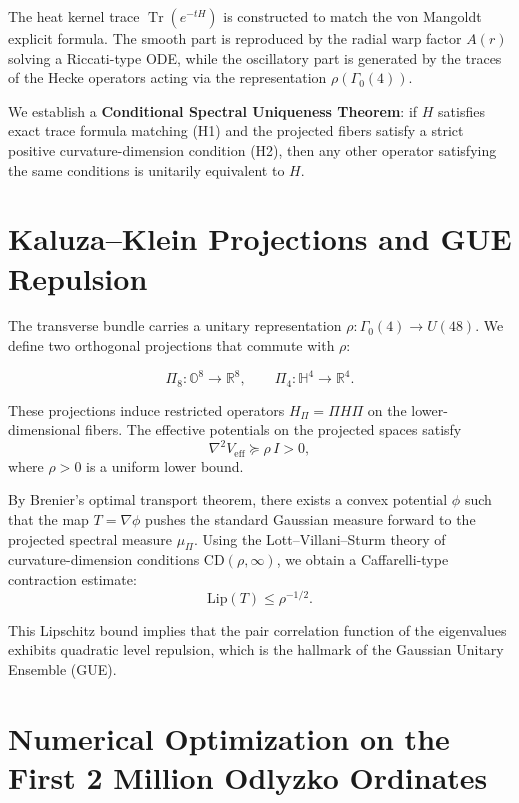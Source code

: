 \documentclass[11pt,a4paper]{article}
\begin{document}
The heat kernel trace \(\operatorname{Tr}(e^{-tH})\) is constructed to match the von Mangoldt explicit formula. The smooth part is reproduced by the radial warp factor \(A(r)\) solving a Riccati-type ODE, while the oscillatory part is generated by the traces of the Hecke operators acting via the representation \(\rho(\Gamma_0(4))\).

We establish a \textbf{Conditional Spectral Uniqueness Theorem}: if \(H\) satisfies exact trace formula matching (H1) and the projected fibers satisfy a strict positive curvature-dimension condition (H2), then any other operator satisfying the same conditions is unitarily equivalent to \(H\).

\section{Kaluza--Klein Projections and GUE Repulsion}

The transverse bundle carries a unitary representation \(\rho: \Gamma_0(4) \to U(48)\). We define two orthogonal projections that commute with \(\rho\):

\begin{equation}
\Pi_8 \colon \mathbb{O}^8 \to \mathbb{R}^8, \qquad \Pi_4 \colon \mathbb{H}^4 \to \mathbb{R}^4.
\end{equation}

These projections induce restricted operators \(H_{\Pi} = \Pi H \Pi\) on the lower-dimensional fibers. The effective potentials on the projected spaces satisfy
\begin{equation}
\nabla^2 V_{\text{eff}} \succeq \rho \, I > 0,
\end{equation}
where \(\rho > 0\) is a uniform lower bound.

By Brenier’s optimal transport theorem, there exists a convex potential \(\phi\) such that the map \(T = \nabla \phi\) pushes the standard Gaussian measure forward to the projected spectral measure \(\mu_{\Pi}\). Using the Lott--Villani--Sturm theory of curvature-dimension conditions \(\mathrm{CD}(\rho, \infty)\), we obtain a Caffarelli-type contraction estimate:
\begin{equation}
\text{Lip}(T) \leq \rho^{-1/2}.
\end{equation}

This Lipschitz bound implies that the pair correlation function of the eigenvalues exhibits quadratic level repulsion, which is the hallmark of the Gaussian Unitary Ensemble (GUE).

\section{Numerical Optimization on the First 2 Million Odlyzko Ordinates}
\end{document}

